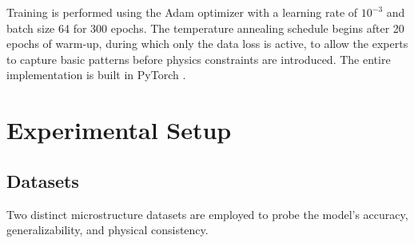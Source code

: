 \documentclass{article}
\begin{document}
Training is performed using the Adam optimizer \cite{kingma2014adam} with a learning rate of \(10^{-3}\) and batch size 64 for 300 epochs. The temperature annealing schedule begins after 20 epochs of warm-up, during which only the data loss is active, to allow the experts to capture basic patterns before physics constraints are introduced. The entire implementation is built in PyTorch \cite{paszke2019pytorch}.

\section{Experimental Setup}

\subsection{Datasets}
Two distinct microstructure datasets are employed to probe the model's accuracy, generalizability, and physical consistency.
\end{document}
